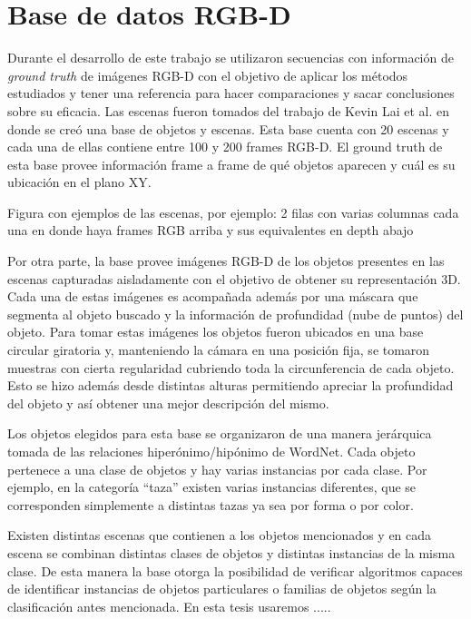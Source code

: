 \chapter{Base de datos RGB-D}\label{base_rgbd}
Durante el desarrollo de este trabajo se utilizaron secuencias con información de \textit{ground truth} de imágenes RGB-D con el objetivo de aplicar los métodos estudiados y tener una referencia para hacer comparaciones y sacar conclusiones sobre su eficacia. Las escenas fueron tomados del trabajo de Kevin Lai et al. \cite{lai2011large} en donde se creó una base de objetos y escenas. Esta base cuenta con 20 escenas y cada una de ellas contiene entre 100 y 200 frames RGB-D. El ground truth de esta base provee información frame a frame de qué objetos aparecen y cuál es su ubicación en el plano XY.

{\huge Figura con ejemplos de las escenas, por ejemplo: 2 filas con varias columnas cada una en donde haya frames RGB arriba y sus equivalentes en depth abajo}

Por otra parte, la base provee imágenes RGB-D de los objetos presentes en las escenas capturadas aisladamente con el objetivo de obtener su representación 3D. Cada una de estas imágenes es acompañada además por una máscara que segmenta al objeto buscado y la información de profundidad (nube de puntos) del objeto. Para tomar estas imágenes los objetos fueron ubicados en una base circular giratoria y, manteniendo la cámara en una posición fija, se tomaron muestras con cierta regularidad cubriendo toda la circunferencia de cada objeto. Esto se hizo además desde distintas alturas permitiendo apreciar la profundidad del objeto y así obtener una mejor descripción del mismo.

Los objetos elegidos para esta base se organizaron de una manera jerárquica tomada de las relaciones hiperónimo/hipónimo de WordNet. Cada objeto pertenece a una clase de objetos y hay varias instancias por cada clase. Por ejemplo, en la categoría ``taza'' existen varias instancias diferentes, que se corresponden simplemente a distintas tazas ya sea por forma o por color.

Existen distintas escenas que contienen a los objetos mencionados y en cada escena se combinan distintas clases de objetos y distintas instancias de la misma clase. De esta manera la base otorga la posibilidad de verificar algoritmos capaces de identificar instancias de objetos particulares o familias de objetos según la clasificación antes mencionada. En esta tesis usaremos .....

